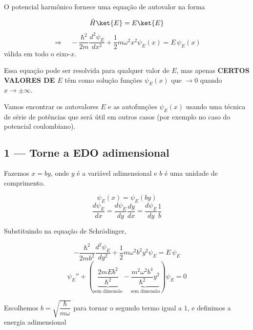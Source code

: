 O potencial harmônico fornece uma equação de autovalor na forma

\begin{equation}
    \hat{H}\ket{E} = E\ket{E}
\label{eq:aula16_eq_autovalor_ket}
\end{equation}
\begin{equation}
    \Longrightarrow \quad -\frac{\hbar^2}{2m}\frac{d^2\psi_E}{dx^2} + \frac{1}{2}m\omega^2 x^2 \psi_E(x) = E\,\psi_E(x)
\label{eq:aula16_eq_schrodinger_oh}
\end{equation}
válida em todo o eixo-$x$.

Essa equação pode ser resolvida para qualquer valor de $E$, mas apenas \textbf{CERTOS VALORES DE $E$} têm como solução funções $\psi_E(x)$ que $\to 0$ quando $x \to \pm\infty$.

Vamos encontrar os autovalores $E$ e as autofunções $\psi_E(x)$ usando uma técnica de série de potências que será útil em outros casos (por exemplo no caso do potencial coulombiano).

\subsection*{1 --- Torne a EDO adimensional}

Fazemos $x = by$, onde $y$ é a variável adimensional e $b$ é uma unidade de comprimento.

\begin{equation}
    \psi_E(x) = \psi_E(by)
\label{eq:aula16_mudanca_variavel}
\end{equation}
\begin{equation}
    \frac{d\psi_E}{dx} = \frac{d\psi_E}{dy}\frac{dy}{dx} = \frac{d\psi_E}{dy}\frac{1}{b}
\label{eq:aula16_derivada_cadeia}
\end{equation}

Substituindo na equação de Schrödinger,

\begin{equation}
    -\frac{\hbar^2}{2mb^2}\frac{d^2\psi_E}{dy^2} + \frac{1}{2}m\omega^2 b^2 y^2 \psi_E = E\,\psi_E
\label{eq:aula16_eq_em_y}
\end{equation}
\begin{equation}
    \psi_E'' + \left( \underbrace{\frac{2mEb^2}{\hbar^2}}_{\text{sem dimensão}} - \underbrace{\frac{m^2\omega^2 b^4}{\hbar^2}y^2}_{\text{sem dimensão}} \right)\psi_E = 0
\label{eq:aula16_eq_adim_intermediaria}
\end{equation}

Escolhemos $b = \sqrt{\dfrac{\hbar}{m\omega}}$ para tornar o segundo termo igual a $1$, e definimos a energia adimensional

